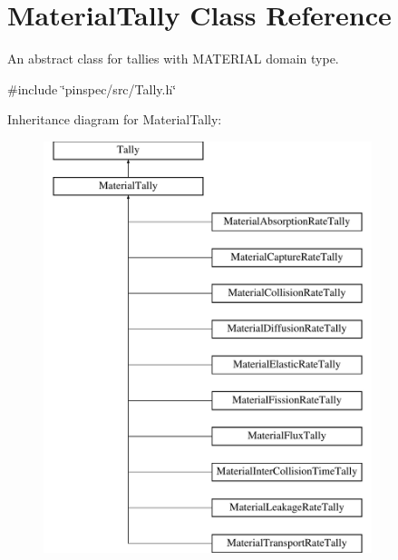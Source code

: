 \hypertarget{classMaterialTally}{\section{Material\-Tally Class Reference}
\label{classMaterialTally}
}


An abstract class for tallies with M\-A\-T\-E\-R\-I\-A\-L domain type.  




{\ttfamily \#include \char`\"{}pinspec/src/\-Tally.\-h\char`\"{}}

Inheritance diagram for Material\-Tally\-:\begin{figure}[H]
\begin{center}
\leavevmode
\includegraphics[height=12.000000cm]{classMaterialTally}
\end{center}
\end{figure}
